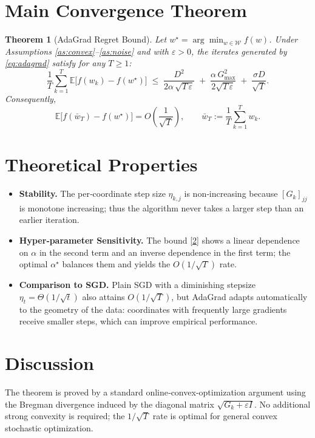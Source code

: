 \documentclass{article}
\newtheorem{theorem}{Theorem}
\newcommand{\E}{\mathbb{E}}
\begin{document}
\section*{Main Convergence Theorem}
\begin{theorem}[AdaGrad Regret Bound]\label{thm:regret}
Let $w^\star=\arg\min_{w\in\mathcal{W}}f(w)$. Under Assumptions
\ref{as:convex}–\ref{as:noise} and with $\varepsilon>0$, the iterates generated by
\eqref{eq:adagrad} satisfy for any $T\ge1$:
\[
\boxed{
\frac{1}{T}\sum_{k=1}^{T}\E\!\big[f(w_k)-f(w^\star)\big]
\;\le\;
\frac{D^2}{2\alpha\,\sqrt{T\,\varepsilon}}
\;+\;
\frac{\alpha\,G_{\max}^2}{2\sqrt{T\,\varepsilon}}
\;+\;
\frac{\sigma D}{\sqrt{T}} }.
\tag{2}
\]
Consequently,
\[
\E\!\big[f(\bar w_T)-f(w^\star)\big]=O\!\left(\frac{1}{\sqrt{T}}\right),
\qquad
\bar w_T:=\frac1T\sum_{k=1}^{T} w_k .
\]
\end{theorem}

\section*{Theoretical Properties}
\begin{itemize}
\item \textbf{Stability.} The per‑coordinate step size $\eta_{k,j}$ is non‑increasing
      because $[G_k]_{jj}$ is monotone increasing; thus the algorithm never
      takes a larger step than an earlier iteration.
\item \textbf{Hyper‑parameter Sensitivity.} The bound \eqref{2} shows a linear
      dependence on $\alpha$ in the second term and an inverse dependence in the
      first term; the optimal $\alpha^\star$ balances them and yields the
      $O(1/\sqrt{T})$ rate.
\item \textbf{Comparison to SGD.} Plain SGD with a diminishing stepsize
      $\eta_t=\Theta(1/\sqrt{t})$ also attains $O(1/\sqrt{T})$, but AdaGrad adapts
      automatically to the geometry of the data: coordinates with frequently large
      gradients receive smaller steps, which can improve empirical performance.
\end{itemize}

\section*{Discussion}
The theorem is proved by a standard online‑convex‑optimization argument
using the Bregman divergence induced by the diagonal matrix $\sqrt{G_k+\varepsilon I}$.
No additional strong convexity is required; the $1/\sqrt{T}$ rate is optimal for
general convex stochastic optimization.
\end{document}
